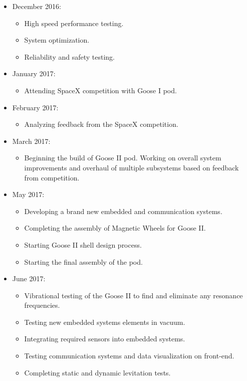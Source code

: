 \documentclass[main.tex]{subfiles}
\begin{document}
\begin{flushleft}
\begin{itemize}
\item December 2016:
\begin{itemize}
    \item High speed performance testing.
    \item System optimization.
    \item Reliability and safety testing.
\end{itemize}

\item January 2017:
\begin{itemize}
    \item Attending SpaceX competition with Goose I pod.
\end{itemize}

\item February 2017:
\begin{itemize}
    \item Analyzing feedback from the SpaceX competition.
\end{itemize}

\item March 2017:
\begin{itemize}
    \item Beginning the build of Goose II pod. Working on overall system improvements and overhaul of multiple subsystems based on feedback from competition.
\end{itemize}

\item May 2017:
\begin{itemize}
    \item Developing a brand new embedded and communication systems.
    \item Completing the assembly of Magnetic Wheels for Goose II.
    \item Starting Goose II shell design process.
    \item Starting the final assembly of the pod.
\end{itemize}

\item June 2017:
\begin{itemize}
    \item Vibrational testing of the Goose II to find and eliminate any resonance frequencies.
    \item Testing new embedded systems elements in vacuum.
    \item Integrating required sensors into embedded systems.
    \item Testing communication systems and data visualization on front-end.
    \item Completing static and dynamic levitation tests.
\end{itemize}


\end{itemize}
\end{flushleft}
\end{document}
